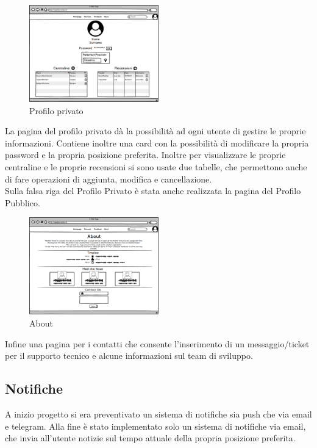 \begin{figure}[H]
    \caption{Profilo privato}
    \label{fig:Home}
    \centering
    \includegraphics[width=0.5\textwidth]{MockUps/Private Profile.png}
\end{figure}
La pagina del profilo privato dà la possibilità ad ogni utente di gestire le proprie informazioni. Contiene inoltre una card con la possibilità di modificare la propria password e la propria posizione preferita. 
Inoltre per visualizzare le proprie centraline e le proprie recensioni si sono usate due tabelle, che permettono anche di fare operazioni di aggiunta, modifica e cancellazione.\\

Sulla falsa riga del Profilo Privato è stata anche realizzata la pagina del Profilo Pubblico.

\begin{figure}[H]
    \caption{About}
    \label{fig:Home}
    \centering
    \includegraphics[width=0.5\textwidth]{MockUps/about.png}
\end{figure}
Infine una pagina per i contatti che consente l'inserimento di un messaggio/ticket
per il supporto tecnico e alcune informazioni sul team di sviluppo.

\subsection{Notifiche}
A inizio progetto si era preventivato un sistema di notifiche sia push che via email e telegram. 
Alla fine è stato implementato solo un sistema di notifiche via email, che invia all'utente notizie sul tempo attuale della propria posizione preferita. 



